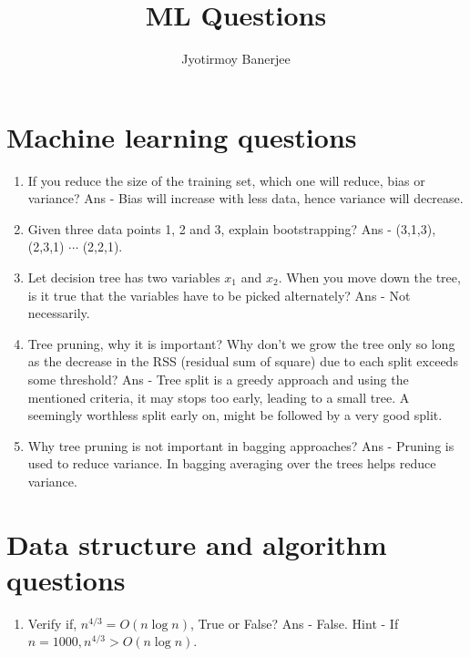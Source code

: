 \documentclass{article}
\title{ML Questions}
\author{Jyotirmoy Banerjee}
\begin{document}
\maketitle

\section{Machine learning questions}

\begin{enumerate}
\item If you reduce the size of the training set, which one will reduce, bias or variance? Ans - Bias will increase with less data, hence variance will decrease.
\item Given three data points 1, 2 and 3, explain bootstrapping? Ans - (3,1,3), (2,3,1) $\cdots$ (2,2,1).
\item Let decision tree has two variables $x_1$ and $x_2$. When you move down the tree, is it true that the variables have to be picked alternately? Ans - Not necessarily. 
\item Tree pruning, why it is important? Why don't we grow the tree only so long as the decrease in the RSS (residual sum of square) due to each split exceeds some threshold? Ans - Tree split is a greedy approach and using the mentioned criteria, it may stops too early, leading to a small tree. A seemingly worthless split early on, might be followed by a very good split.
\item Why tree pruning is not important in bagging approaches? Ans - Pruning is used to reduce variance. In bagging averaging over the trees helps reduce variance.
\end{enumerate}

\section{Data structure and algorithm questions}

\begin{enumerate}
\item Verify if, $n^{4/3} = O(n \log n)$, True or False? Ans - False. Hint - If $n = 1000, n^{4/3} > O(n \log n)$.
\end{enumerate}
\end{document}
